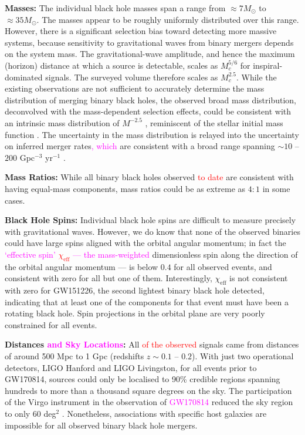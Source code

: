 \documentclass[iop,onecolumn]{revtex4}
\newcommand{\ajf}[1]{\textcolor{red}{#1}}
\newcommand{\ilya}[1]{\textcolor{magenta}{#1}}
\begin{document}
\textbf{Masses:} The individual black hole masses span a range from $\approx 7 M_\odot$ to $\approx 35 M_\odot$.  The masses appear to be roughly uniformly distributed over this range.  However, there is a significant selection bias  toward detecting more massive systems, because sensitivity to gravitational waves from binary mergers depends on the system mass.  The gravitational-wave amplitude, and hence the maximum (horizon) distance at which a source is detectable, scales as $M_c^{5/6}$ for inspiral-dominated signals. The surveyed volume therefore scales as $M_c^{2.5}$.  While the existing observations are not sufficient to accurately determine the mass distribution of merging binary black holes, the observed broad mass distribution, deconvolved with the mass-dependent selection effects, could be consistent with an intrinsic mass distribution of $M^{-2.5}$ \citep{BBH:O1,GW170104}, reminiscent of the stellar initial mass function \citep{Salpeter:1955}.  The uncertainty in the mass distribution is relayed into the uncertainty on inferred merger rates\ilya{, which} are consistent with a broad range spanning $\sim 10$ -- $200$ Gpc$^{-3}$ yr$^{-1}$ \citep{GW170104}.  

\textbf{Mass Ratios:} While all binary black holes observed \ajf{to date} are consistent with having equal-mass components, mass ratios could be as extreme as $4:1$ in some cases.  

\textbf{Black Hole Spins:} Individual black hole spins are difficult to measure precisely with gravitational waves.  However, we do know that none of the observed binaries could have large spins aligned with the orbital angular momentum; in fact the \ilya{`effective spin' \ajf{$\chi_\textrm{eff}$} --- the mass-weighted} dimensionless spin along the direction of the orbital angular momentum --- is below $0.4$ for all observed events, and consistent with zero for all but one of them.  Interestingly, $\chi_\textrm{eff}$ is not consistent with zero for GW151226, the second lightest binary black hole detected, indicating that at least one of the components for that event must have been a rotating black hole.  Spin projections in the orbital plane are very poorly constrained for all events.

\textbf{Distances \ilya{and Sky Locations}:} All \ajf{of the observed} signals came from distances of around 500 Mpc to 1 Gpc (redshifts $z\sim 0.1$ -- $0.2$).  With just two operational detectors, LIGO Hanford and LIGO Livingston, for all events prior to GW170814, sources could only be localised to 90\% credible regions spanning hundreds to more than a thousand square degrees on the sky.  The participation of the Virgo instrument in the observation of \ilya{GW170814} reduced the sky region to only 60 deg$^2$ \citep{GW170814}.  Nonetheless, associations with specific host galaxies are impossible for all observed binary black hole mergers.  
\end{document}
